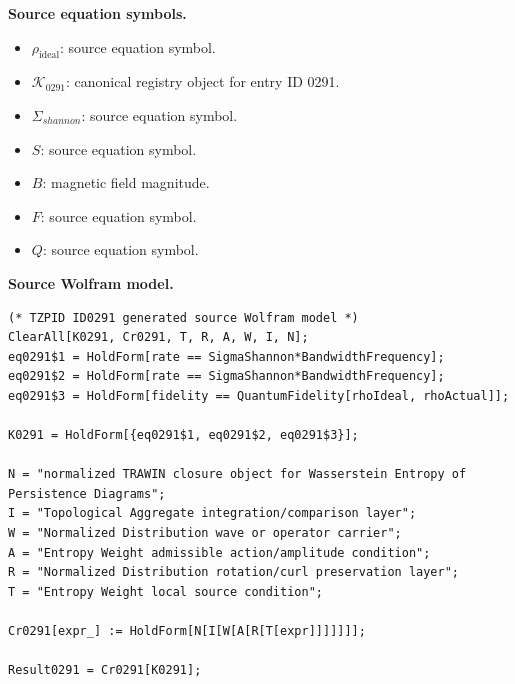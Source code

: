 \begin{minipage}[t]{0.49\linewidth}
\begingroup
\small
\raggedright
\textbf{Source equation symbols.}\par
\begin{itemize}[leftmargin=1.35em,itemsep=1pt,topsep=1pt,parsep=0pt]
    \item $\rho_{\mathrm{ideal}}$: source equation symbol.
    \item $\mathcal{K}_{0291}$: canonical registry object for entry ID 0291.
    \item $\Sigma_{shannon}$: source equation symbol.
    \item $S$: source equation symbol.
    \item $B$: magnetic field magnitude.
    \item $F$: source equation symbol.
    \item $Q$: source equation symbol.
\end{itemize}
\endgroup
\end{minipage}\hfill
\begin{minipage}[t]{0.47\linewidth}
\begingroup
\scriptsize
\raggedright
\textbf{Source Wolfram model.}\par
\begin{Verbatim}[fontsize=\tiny,breaklines=true,breakanywhere=true]
(* TZPID ID0291 generated source Wolfram model *)
ClearAll[K0291, Cr0291, T, R, A, W, I, N];
eq0291$1 = HoldForm[rate == SigmaShannon*BandwidthFrequency];
eq0291$2 = HoldForm[rate == SigmaShannon*BandwidthFrequency];
eq0291$3 = HoldForm[fidelity == QuantumFidelity[rhoIdeal, rhoActual]];

K0291 = HoldForm[{eq0291$1, eq0291$2, eq0291$3}];

N = "normalized TRAWIN closure object for Wasserstein Entropy of Persistence Diagrams";
I = "Topological Aggregate integration/comparison layer";
W = "Normalized Distribution wave or operator carrier";
A = "Entropy Weight admissible action/amplitude condition";
R = "Normalized Distribution rotation/curl preservation layer";
T = "Entropy Weight local source condition";

Cr0291[expr_] := HoldForm[N[I[W[A[R[T[expr]]]]]]];

Result0291 = Cr0291[K0291];
\end{Verbatim}
\endgroup
\end{minipage}

